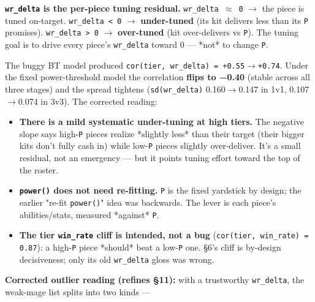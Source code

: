 \documentclass[10pt]{article}
\begin{document}
\begin{quotebox}
\textbf{\texttt{wr\_\allowbreak{}delta} is the per-piece tuning residual.} \texttt{wr\_\allowbreak{}delta $\approx$ 0} $\rightarrow$ the piece is tuned on-target. \texttt{wr\_\allowbreak{}delta < 0} $\rightarrow$ \textbf{under-tuned} (its kit delivers less than its \texttt{P} promises). \texttt{wr\_\allowbreak{}delta > 0} $\rightarrow$ \textbf{over-tuned} (kit over-delivers vs \texttt{P}). The tuning goal is to drive every piece's \texttt{wr\_\allowbreak{}delta} toward 0 --- *not* to change \texttt{P}.
\end{quotebox}

The buggy BT model produced \texttt{cor(\allowbreak{}tier,\allowbreak{} wr\_\allowbreak{}delta)\allowbreak{} = +\allowbreak{}0.\allowbreak{}55$\rightarrow$+\allowbreak{}0.\allowbreak{}74}. Under the fixed power-threshold model the correlation \textbf{flips to −0.40} (stable across all three stages) and the spread tightens (\texttt{sd(\allowbreak{}wr\_\allowbreak{}delta)\allowbreak{}} 0.160$\rightarrow$0.147 in 1v1, 0.107$\rightarrow$0.074 in 3v3). The corrected reading:\\

\begin{itemize}
\item \textbf{There is a mild systematic under-tuning at high tiers.} The negative slope says high-\texttt{P} pieces realize *slightly less* than their target (their bigger kits don't fully cash in) while low-\texttt{P} pieces slightly over-deliver. It's a small residual, not an emergency --- but it points tuning effort toward the top of the roster.
\item \textbf{\texttt{power(\allowbreak{})\allowbreak{}} does not need re-fitting.} \texttt{P} is the fixed yardstick by design; the earlier "re-fit \texttt{power(\allowbreak{})\allowbreak{}}" idea was backwards. The lever is each piece's abilities/stats, measured *against* \texttt{P}.
\item \textbf{The tier \texttt{win\_\allowbreak{}rate} cliff is intended, not a bug} (\texttt{cor(\allowbreak{}tier,\allowbreak{} win\_\allowbreak{}rate)\allowbreak{} = 0.\allowbreak{}87}): a high-\texttt{P} piece *should* beat a low-\texttt{P} one. \S{}6's cliff is by-design decisiveness; only its old \texttt{wr\_\allowbreak{}delta} gloss was wrong.
\end{itemize}

\textbf{Corrected outlier reading (refines \S{}11):} with a trustworthy \texttt{wr\_\allowbreak{}delta}, the weak-mage list splits into two kinds ---\\
\end{document}
